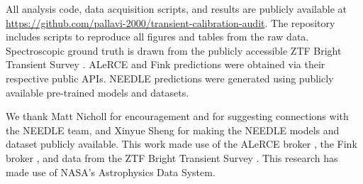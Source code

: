 \documentclass[twocolumn]{aastex631}
\begin{document}
All analysis code, data acquisition scripts, and results are publicly available at \url{https://github.com/pallavi-2000/transient-calibration-audit}. The repository includes scripts to reproduce all figures and tables from the raw data. Spectroscopic ground truth is drawn from the publicly accessible ZTF Bright Transient Survey \citep{fremling2020, perley2020}. ALeRCE and Fink predictions were obtained via their respective public APIs. NEEDLE predictions were generated using publicly available pre-trained models and datasets.


\begin{acknowledgments}
We thank Matt Nicholl for encouragement and for suggesting connections with the NEEDLE team, and Xinyue Sheng for making the NEEDLE models and dataset publicly available. This work made use of the ALeRCE broker \citep{forster2021}, the Fink broker \citep{moller2021}, and data from the ZTF Bright Transient Survey \citep{fremling2020, perley2020}. This research has made use of NASA's Astrophysics Data System.
\end{acknowledgments}






\end{document}

